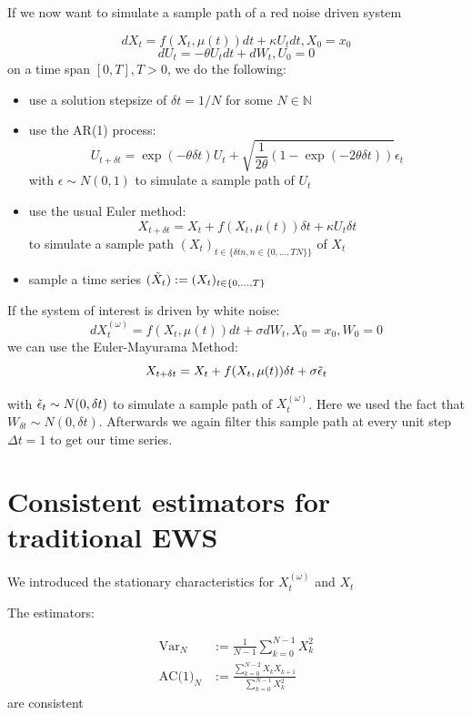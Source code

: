 \documentclass[%
thesis=student,%
coverpage=false,%
titlepage=false,%
headmarks=true, %
german,%
font=libertine, %
math=newpxtx, %
BCOR=5mm,%
coverBCOR=11mm%
]{tumbook}
\begin{document}
If we now want to simulate a sample path of a red noise driven system

\[ 
     dX_{t} = f(X_{t},\mu(t))dt + \kappa U_{t}dt, X_{0} = x_{0}
\]
\[
     dU_{t} = -\theta U_{t}dt + dW_{t}, U_{0} = 0
\]
on a time span $[0,T], T > 0$, we do the following: 
\begin{itemize}
    \item use a solution stepsize of $\delta t = 1/N$ for some $N \in \mathbb{N}$
    \item use the AR(1) process:
    \[
    U_{t+\delta t} = \exp(-\theta \delta t)U_{t} + \sqrt{\frac{1}{2\theta}(1-\exp(-2\theta \delta t))}\epsilon_{t}
    \]
    with $\epsilon \sim N(0,1)$ to simulate a sample path of $U_{t}$
    \item use the usual Euler method:
    \[
        X_{t+\delta t} = X_{t} + f(X_{t},\mu(t))\delta t + \kappa U_{t}\delta t
    \]
    to simulate a sample path $(X_{t})_{t\in\{\delta t n, n \in \{0,...,TN\}\}}$ of $X_{t}$
    \item sample a time series $(\Tilde{X}_t) := (X_t)_{t\in\{0,...,T\}}$
\end{itemize}


If the system of interest is driven by white noise: 
\[
    dX_{t}^{(\omega)} = f(X_{t},\mu(t))dt + \sigma dW_{t}, X_{0} = x_{0}, W_{0} = 0
\]
we can use the Euler-Mayurama Method:
\[
X_{t+\delta t} = X_{t} + f(X_{t},\mu(t))\delta t + \sigma\Tilde{\epsilon}_t
\]

with $\Tilde{\epsilon}_t \sim N(0,\delta t)$ to simulate a sample path of $X_{t}^{(\omega)}$. Here we used the fact that $W_{\delta t} \sim N(0,\delta t)$. Afterwards we again filter this sample path at every unit step $\Delta t = 1$ to get our time series.



\chapter{Consistent estimators for traditional EWS}

We introduced the stationary characteristics  for $X_{t}^{(\omega)}$ and $X_{t}$

The estimators:

\begin{subequations}
        \begin{align*}
            \text{Var}_{N} &:= \frac{1}{N-1}\sum_{k=0}^{N-1}X_{k}^{2} \\
            \text{AC(1)}_{N} &:= \frac{\sum_{k=0}^{N-2}X_{k}X_{k+1}}{\sum_{k=0}^{N-1}X_{k}^{2}}
        \end{align*}
    \end{subequations}
    are consistent 
\end{document}
